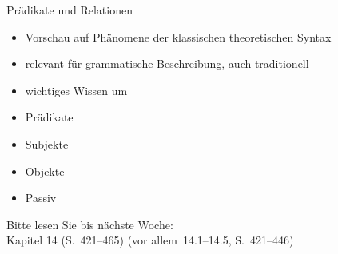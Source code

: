 \begin{frame}
  {Prädikate und Relationen}
  \pause
  \begin{itemize}[<+->]
    \item Vorschau auf Phänomene der klassischen theoretischen Syntax
    \item \alert{relevant für grammatische Beschreibung}, auch traditionell
    \item wichtiges Wissen um 
      \Halbzeile
    \item Prädikate
    \item Subjekte
    \item Objekte
    \item \alert{Passiv}
  \end{itemize}
  \pause
  \Halbzeile
  \begin{center}
    Bitte lesen Sie bis nächste Woche:\\
    \alert{Kapitel 14 (S.~421--465)} (vor allem 14.1--14.5, S.~421--446)
  \end{center}
\end{frame}
